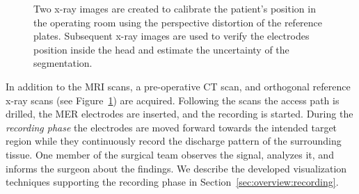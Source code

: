 \documentclass{vgtc}                          %
\begin{document}
\begin{figure}[b]
    \centering
    \hspace*{0.1cm}
    \caption{Two x-ray images are created to calibrate the patient's position in the operating room using the perspective distortion of the reference plates. Subsequent x-ray images are used to verify the electrodes position inside the head and estimate the uncertainty of the segmentation.}
    \label{fig:xrayreferencescans}
\end{figure}

In addition to the MRI scans, a pre-operative CT scan, and orthogonal reference x-ray scans  (see Figure~\ref{fig:xrayreferencescans}) are acquired. Following the scans the access path is drilled, the MER electrodes are inserted, and the recording is started. During the \emph{recording phase} the electrodes are moved forward towards the intended target region while they continuously record the discharge pattern of the surrounding tissue. One member of the surgical team observes the signal, analyzes it, and informs the surgeon about the findings. We describe the developed visualization techniques supporting the recording phase in Section~\ref{sec:overview:recording}.
\end{document}
